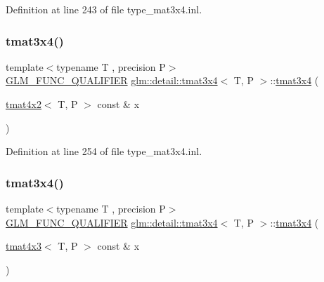 Definition at line 243 of file type\+\_\+mat3x4.\+inl.

\mbox{\label{structglm_1_1detail_1_1tmat3x4_aa3747818fd18f9998c5fc79ce434c236}} 
\subsubsection{\texorpdfstring{tmat3x4()}{tmat3x4()}\hspace{0.1cm}{\footnotesize\ttfamily [17/22]}}
{\footnotesize\ttfamily template$<$typename T , precision P$>$ \\
\hyperlink{setup_8hpp_a33fdea6f91c5f834105f7415e2a64407}{G\+L\+M\+\_\+\+F\+U\+N\+C\+\_\+\+Q\+U\+A\+L\+I\+F\+I\+ER} \hyperlink{structglm_1_1detail_1_1tmat3x4}{glm\+::detail\+::tmat3x4}$<$ T, P $>$\+::\hyperlink{structglm_1_1detail_1_1tmat3x4}{tmat3x4} (\begin{DoxyParamCaption}\item[{\hyperlink{structglm_1_1detail_1_1tmat4x2}{tmat4x2}$<$ T, P $>$ const \&}]{x }\end{DoxyParamCaption})\hspace{0.3cm}{\ttfamily [explicit]}}



Definition at line 254 of file type\+\_\+mat3x4.\+inl.

\mbox{\label{structglm_1_1detail_1_1tmat3x4_abde714d32a6d0da024687e6026f47e55}} 
\subsubsection{\texorpdfstring{tmat3x4()}{tmat3x4()}\hspace{0.1cm}{\footnotesize\ttfamily [18/22]}}
{\footnotesize\ttfamily template$<$typename T , precision P$>$ \\
\hyperlink{setup_8hpp_a33fdea6f91c5f834105f7415e2a64407}{G\+L\+M\+\_\+\+F\+U\+N\+C\+\_\+\+Q\+U\+A\+L\+I\+F\+I\+ER} \hyperlink{structglm_1_1detail_1_1tmat3x4}{glm\+::detail\+::tmat3x4}$<$ T, P $>$\+::\hyperlink{structglm_1_1detail_1_1tmat3x4}{tmat3x4} (\begin{DoxyParamCaption}\item[{\hyperlink{structglm_1_1detail_1_1tmat4x3}{tmat4x3}$<$ T, P $>$ const \&}]{x }\end{DoxyParamCaption})\hspace{0.3cm}{\ttfamily [explicit]}}



